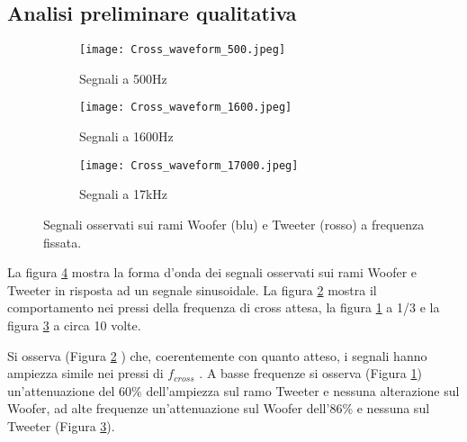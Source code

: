 \documentclass[../Relazione_circuiti]{subfiles}
\begin{document}
\subsection{Analisi preliminare qualitativa}

  \begin{figure}[H]
    \centering

    \begin{subfigure}[b]{0.3\textwidth}
      \centering
      \texttt{[image: Cross\_waveform\_500.jpeg]}

      \caption{Segnali a 500Hz}
      \label{fig:signal_500}

    \end{subfigure}
    \begin{subfigure}[b]{0.3\textwidth}
      \centering
      \texttt{[image: Cross\_waveform\_1600.jpeg]}

      \caption{Segnali a 1600Hz}
      \label{fig:signal_1600}

    \end{subfigure}
    \begin{subfigure}[b]{0.3\textwidth}
      \centering
      \texttt{[image: Cross\_waveform\_17000.jpeg]}

      \caption{Segnali a 17kHz}
      \label{fig:signal_17k}

    \end{subfigure}
    \hfill

    \caption{Segnali osservati sui rami Woofer (blu) e Tweeter (rosso)
      a frequenza fissata.}
    \label{fig:signal_waveforms}

  \end{figure}

  La figura \ref{fig:signal_waveforms}
  mostra la forma d'onda dei segnali osservati sui rami Woofer e Tweeter in risposta ad un segnale sinusoidale. La
  figura \ref{fig:signal_1600} mostra il comportamento nei pressi della frequenza di cross attesa, la figura
  \ref{fig:signal_500} a 1/3 e la figura \ref{fig:signal_17k} a circa 10 volte.

  Si osserva (Figura \ref{fig:signal_1600}
  ) che, coerentemente con quanto atteso, i segnali hanno ampiezza simile nei pressi di $f_{cross}$
  . A basse frequenze si osserva (Figura \ref{fig:signal_500}) un'attenuazione del 60\%
  dell'ampiezza sul ramo Tweeter e nessuna alterazione sul Woofer, ad alte frequenze un'attenuazione sul Woofer
  dell'86\% e nessuna sul Tweeter (Figura \ref{fig:signal_17k}).
\end{document}
